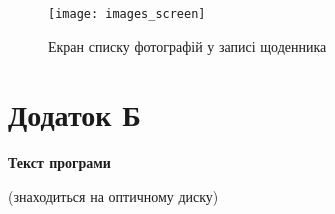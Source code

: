 \begin{figure}[H]
	\centering
	\texttt{[image: images\_screen]}
	\caption{Екран списку фотографій у записі щоденника}
	\label{photo_screen}
\end{figure}

\newpage
\section*{Додаток Б}
\begin{center}
	\bfseries Текст програми
\end{center}

\begin{center}
	(знаходиться на оптичному диску)
\end{center}